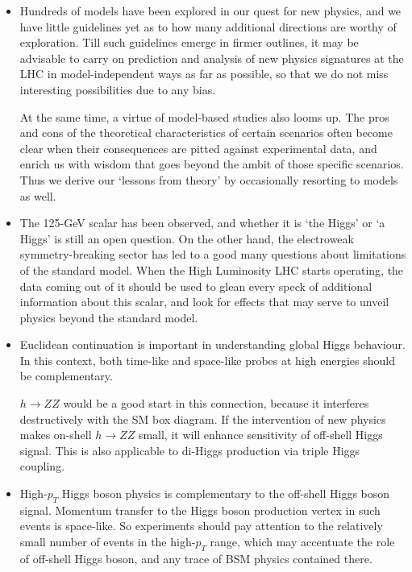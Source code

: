 \documentclass[10pt]{article}
\begin{document}
\begin{itemize}
	\item Hundreds of models have been explored in our quest for new physics,
	and we have little guidelines yet as to how many additional directions
	are worthy of exploration. Till such guidelines emerge in firmer outlines, it may be advisable to carry on prediction and analysis of new physics signatures at the LHC in  model-independent ways as far as possible, so that we do not miss interesting possibilities due to any bias.
	
	At the same time, a virtue of model-based studies also looms up. The pros and cons of the theoretical characteristics of certain scenarios often become clear when their consequences are pitted against experimental data, and enrich us with wisdom that  goes beyond the ambit of those specific scenarios. Thus we derive our `lessons from theory' by occasionally resorting to models as well. 
	
	\item The 125-GeV scalar has been observed, and  whether it is `the Higgs' or `a Higgs' is still an open question. On the other hand, the electroweak symmetry-breaking sector has led to a good many questions about limitations of the standard model. 
	When the High Luminosity LHC starts operating, the data coming out of it should be used to glean every speck of additional information about this scalar, and look for effects that may serve to unveil physics beyond the standard model.
	
	\item Euclidean continuation is important in understanding global Higgs behaviour. In this context, both time-like and space-like probes at high energies should be complementary.
	
	$h \rightarrow ZZ$ would be a good start in this connection, because it interferes destructively with the SM box diagram. If the intervention of new physics makes on-shell $h \rightarrow ZZ$ small, it will enhance sensitivity 
	of off-shell Higgs signal. This is also applicable to di-Higgs production via triple Higgs coupling. 
	
	\item High-$p_T$ Higgs boson physics is complementary to the off-shell Higgs boson signal. Momentum transfer to 
	the Higgs boson production vertex in such events is space-like. So experiments should pay attention to 
	the relatively small number of events in the high-$p_T$ range, which may accentuate the
	role of off-shell Higgs boson, and any trace of BSM physics contained there.
	

\end{itemize}
\end{document}
